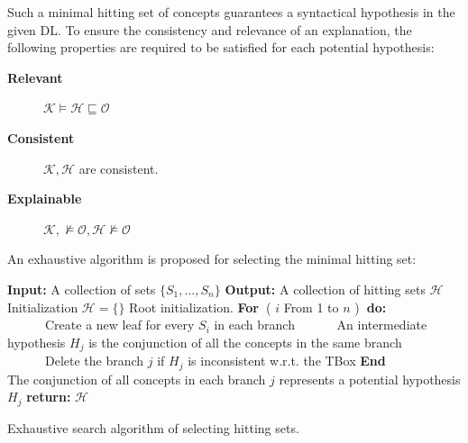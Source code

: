 \documentclass{article}
\begin{document}
Such a minimal hitting set of concepts guarantees a syntactical hypothesis in the given DL. 
To ensure the consistency and relevance of an explanation, the following properties are required to be satisfied for each potential hypothesis:
\begin{description}
 \item[\textbf{Relevant}] $\mathcal{K}\vDash \mathcal{H} \sqsubseteq \mathcal{O}$
 \item[\textbf{Consistent}] $\mathcal{K},\mathcal{H} $ are consistent.
 \item[\textbf{Explainable}] $\mathcal{K},\nvDash \mathcal{O}, \mathcal{H}   \nvDash \mathcal{O}$
\end{description}
\medskip

An exhaustive algorithm is proposed for selecting the minimal hitting set:

\begin{algorithm}[H]
\textbf{Input:} A collection of sets $\{S_1,\dots,S_n\}$\;
\textbf{Output:} A collection of hitting sets $\mathcal{H}$\;
Initialization\:
$\mathcal{H}=\{\}$\;
Root initialization.\;
\textbf{For~}( $i$ From 1 to $n$ )\textbf{~do:}\\
~~~~~~Create a new leaf for every  $S_i$  in each branch\;
~~~~~~An intermediate hypothesis $H_{j}$ is the conjunction of all the concepts in the same branch\;
~~~~~~Delete the branch $j$ if $H_{j}$ is inconsistent w.r.t. the TBox\;
\textbf{End}\\
The conjunction of all concepts in each branch $j$ represents a potential hypothesis $H_j$\;
\textbf{return:} $\mathcal{H}$\;
\caption{Exhaustive search algorithm of selecting hitting sets.}\label{algo:exhaustive}
\end{algorithm}
\end{document}

